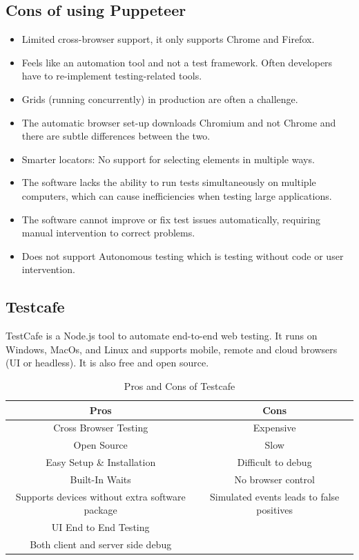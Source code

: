 \documentclass[12pt,a4paper,titlepage]{report}
\begin{document}
\subsection{Cons of using Puppeteer}
\begin{itemize}
 \item Limited cross-browser support, it only supports Chrome and Firefox.
 \item Feels like an automation tool and not a test framework. Often developers have to re-implement testing-related tools.
 \item Grids (running concurrently) in production are often a challenge.
 \item The automatic browser set-up downloads Chromium and not Chrome and there are subtle differences between the two.
 \item Smarter locators: No support for selecting elements in multiple ways.
 \item The software lacks the ability to run tests simultaneously on multiple computers, which can cause inefficiencies when testing large applications.
 \item The software cannot improve or fix test issues automatically, requiring manual intervention to correct problems.
 \item Does not support Autonomous testing which is testing without code or user intervention.
\end{itemize}

\subsection{Testcafe}

TestCafe is a Node.js tool to automate end-to-end web testing. It runs on Windows, MacOs, and Linux and
supports mobile, remote and cloud browsers (UI or headless). It is also free and open source.

\begin{table}[ht]
  \centering
  \small
  \setlength\tabcolsep{6pt}
  \begin{tabular}{|c|c|}
   \hline \textbf
   {Pros} & \textbf {Cons}\\
   \hline\hline
   Cross Browser Testing&Expensive\\
   \hline
   Open Source& Slow\\
   \hline
   Easy Setup \& Installation& Difficult to debug\\
   \hline
   Built-In Waits& No browser control\\
   \hline
   Supports devices without extra software package & Simulated events leads to false positives\\
   \hline
   UI End to End Testing&\\
   \hline
   Both client and server side debug &\\
   \hline
  \end{tabular}
  \caption{Pros and Cons of Testcafe}
 \end{table}
\end{document}
